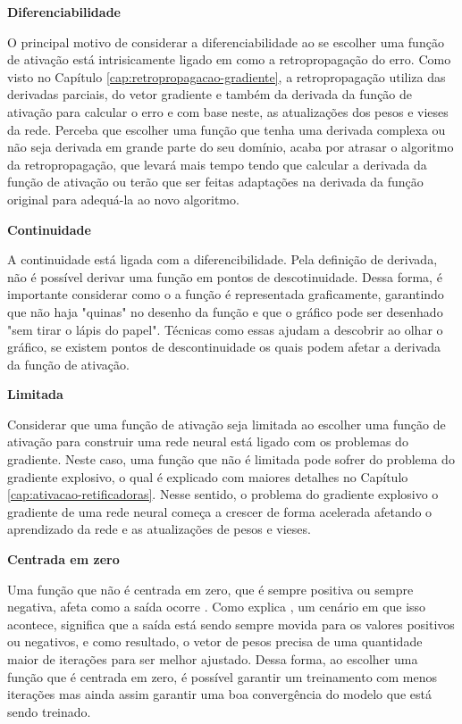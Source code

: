 \textbf{Diferenciabilidade}

O principal motivo de considerar a diferenciabilidade ao se escolher uma função de ativação está intrisicamente ligado em como a retropropagação do erro. Como visto no Capítulo \ref{cap:retropropagacao-gradiente}, a retropropagação utiliza das derivadas parciais, do vetor gradiente e também da derivada da função de ativação para calcular o erro e com base neste, as atualizações dos pesos e vieses da rede. Perceba que escolher uma função que tenha uma derivada complexa ou não seja derivada em grande parte do seu domínio, acaba por atrasar o algoritmo da retropropagação, que levará mais tempo tendo que calcular a derivada da função de ativação ou terão que ser feitas adaptações na derivada da função original para adequá-la ao novo algoritmo.

\textbf{Continuidade}

A continuidade está ligada com a diferencibilidade. Pela definição de derivada, não é possível derivar uma função em pontos de descotinuidade. Dessa forma, é importante considerar como o a função é representada graficamente, garantindo que não haja "quinas" no desenho da função e que o gráfico pode ser desenhado "sem tirar o lápis do papel". Técnicas como essas ajudam a descobrir ao olhar o gráfico, se existem pontos de descontinuidade os quais podem afetar a derivada da função de ativação.

\textbf{Limitada}

Considerar que uma função de ativação seja limitada ao escolher uma função de ativação para construir uma rede neural está ligado com os problemas do gradiente. Neste caso, uma função que não é limitada pode sofrer do problema do gradiente explosivo, o qual é explicado com maiores detalhes no Capítulo \ref{cap:ativacao-retificadoras}. Nesse sentido, o problema do gradiente explosivo o gradiente de uma rede neural começa a crescer de forma acelerada afetando o aprendizado da rede e as atualizações de pesos e vieses.

\textbf{Centrada em zero}

Uma função que não é centrada em zero, que é sempre positiva ou sempre negativa, afeta como a saída ocorre \parencite{PropriedadesFuncoesDeAtivacao}. Como explica \textcite{PropriedadesFuncoesDeAtivacao}, um cenário em que isso acontece, significa que a saída está sendo sempre movida para os valores positivos ou negativos, e como resultado, o vetor de pesos precisa de uma quantidade maior de iterações para ser melhor ajustado. Dessa forma, ao escolher uma função que é centrada em zero, é possível garantir um treinamento com menos iterações mas ainda assim garantir uma boa convergência do modelo que está sendo treinado.

